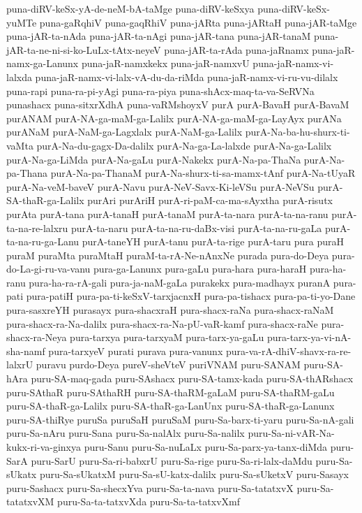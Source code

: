 {puna-diRV-keSx-yA-de-neM-bA-taMge
puna-diRV-keSxya
puna-diRV-keSx-yuMTe
puna-gaRqhiV
puna-gaqRhiV
puna-jARta
puna-jARtaH
puna-jAR-taMge
puna-jAR-ta-nAda
puna-jAR-ta-nAgi
puna-jAR-tana
puna-jAR-tanaM
puna-jAR-ta-ne-ni-si-ko-LuLx-tAtx-neyeV
puna-jAR-ta-rAda
puna-jaRnamx
puna-jaR-namx-ga-Lanunx
puna-jaR-namxkekx
puna-jaR-namxvU
puna-jaR-namx-vi-lalxda
puna-jaR-namx-vi-lalx-vA-du-da-riMda
puna-jaR-namx-vi-ru-vu-dilalx
puna-rapi
puna-ra-pi-yAgi
puna-ra-piya
puna-shAcx-maq-ta-va-SeRVNa
punashacx
puna-sitxrXdhA
puna-vaRMshoyxV
purA
purA-BavaH
purA-BavaM
purANAM
purA-NA-ga-maM-ga-Lalilx
purA-NA-ga-maM-ga-LayAyx
purANa
purANaM
purA-NaM-ga-Lagxlalx
purA-NaM-ga-Lalilx
purA-Na-ba-hu-shurx-ti-vaMta
purA-Na-du-gagx-Da-dalilx
purA-Na-ga-La-lalxde
purA-Na-ga-Lalilx
purA-Na-ga-LiMda
purA-Na-gaLu
purA-Nakekx
purA-Na-pa-ThaNa
purA-Na-pa-Thana
purA-Na-pa-ThanaM
purA-Na-shurx-ti-sa-mamx-tAnf
purA-Na-tUyaR
purA-Na-veM-baveV
purA-Navu
purA-NeV-Savx-Ki-leVSu
purA-NeVSu
purA-SA-thaR-ga-Lalilx
purAri
purAriH
purA-ri-paM-ca-ma-sAyxtha
purA-risutx
purAta
purA-tana
purA-tanaH
purA-tanaM
purA-ta-nara
purA-ta-na-ranu
purA-ta-na-re-lalxru
purA-ta-naru
purA-ta-na-ru-daBx-visi
purA-ta-na-ru-gaLa
purA-ta-na-ru-ga-Lanu
purA-taneYH
purA-tanu
purA-ta-rige
purA-taru
pura
puraH
puraM
puraMta
puraMtaH
puraM-ta-rA-Ne-nAnxNe
purada
pura-do-Deya
pura-do-La-gi-ru-va-vanu
pura-ga-Lanunx
pura-gaLu
pura-hara
pura-haraH
pura-ha-ranu
pura-ha-ra-rA-gali
pura-ja-naM-gaLa
purakekx
pura-madhayx
puranA
pura-pati
pura-patiH
pura-pa-ti-keSxV-tarxjacnxH
pura-pa-tishacx
pura-pa-ti-yo-Dane
pura-sasxreYH
purasayx
pura-shacxraH
pura-shacx-raNa
pura-shacx-raNaM
pura-shacx-ra-Na-dalilx
pura-shacx-ra-Na-pU-vaR-kamf
pura-shacx-raNe
pura-shacx-ra-Neya
pura-tarxya
pura-tarxyaM
pura-tarx-ya-gaLu
pura-tarx-ya-vi-nA-sha-namf
pura-tarxyeV
purati
purava
pura-vanunx
pura-va-rA-dhiV-shavx-ra-re-lalxrU
puravu
purdo-Deya
pureV-sheVteV
puriVNAM
puru-SANAM
puru-SA-hAra
puru-SA-maq-gada
puru-SAshacx
puru-SA-tamx-kada
puru-SA-thARshacx
puru-SAthaR
puru-SAthaRH
puru-SA-thaRM-gaLaM
puru-SA-thaRM-gaLu
puru-SA-thaR-ga-Lalilx
puru-SA-thaR-ga-LanUnx
puru-SA-thaR-ga-Lanunx
puru-SA-thiRye
puruSa
puruSaH
puruSaM
puru-Sa-barx-ti-yaru
puru-Sa-nA-gali
puru-Sa-nAru
puru-Sana
puru-Sa-nalAlx
puru-Sa-nalilx
puru-Sa-ni-vAR-Na-kukx-ri-va-ginxya
puru-Sanu
puru-Sa-nuLaLx
puru-Sa-parx-ya-tanx-diMda
puru-SarA
puru-SarU
puru-Sa-ri-babxrU
puru-Sa-rige
puru-Sa-ri-lalx-daMdu
puru-Sa-sUkatx
puru-Sa-sUkatxM
puru-Sa-sU-katx-dalilx
puru-Sa-sUketxV
puru-Sasayx
puru-Sashacx
puru-Sa-shecxYva
puru-Sa-ta-nava
puru-Sa-tatatxvX
puru-Sa-tatatxvXM
puru-Sa-ta-tatxvXda
puru-Sa-ta-tatxvXmf
}
